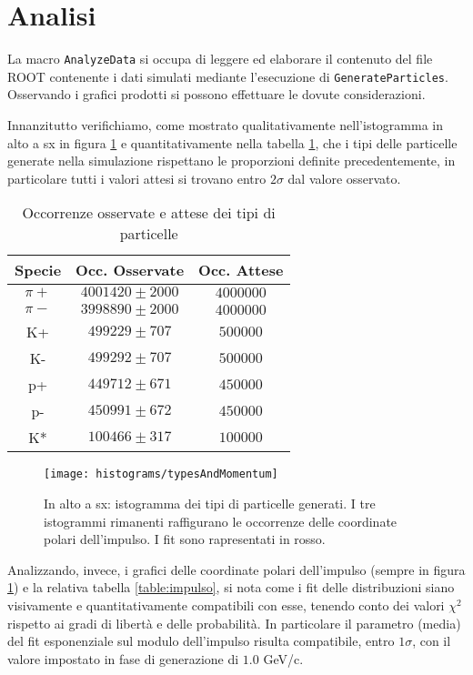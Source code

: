\documentclass{article}
\begin{document}
\section{Analisi}
La macro \texttt{AnalyzeData} si occupa di leggere ed elaborare il contenuto del file ROOT contenente i dati simulati mediante l'esecuzione di \texttt{GenerateParticles}. Osservando i grafici prodotti si possono effettuare le dovute considerazioni.

Innanzitutto verifichiamo, come mostrato qualitativamente nell'istogramma in alto a sx in figura \ref{fig:tipi} e quantitativamente nella tabella \ref{table:tipi}, che i tipi delle particelle generate nella simulazione rispettano le proporzioni definite precedentemente, in particolare tutti i valori attesi si trovano entro $2\sigma$ dal valore osservato.

\begin{table}[h]
    \centering
    \begin{tabular}{||c|c|c||}
        \hline
            Specie & Occ. Osservate & Occ. Attese \\
        \hline \hline
            $\pi+$ & $4001420 \pm 2000$ & $4000000$ \\
        \hline
            $\pi-$ & $3998890 \pm 2000$ & $4000000$ \\
        \hline
            K+ & $499229 \pm 707$ & $500000$ \\
        \hline
            K- & $499292 \pm 707$ & $500000$ \\
        \hline
            p+ & $449712 \pm 671$ & $450000$ \\
        \hline
            p- & $450991 \pm 672$ & $450000$ \\
        \hline
            K* & $100466 \pm 317$ & $100000$ \\
        \hline
    \end{tabular}
    \caption{Occorrenze osservate e attese dei tipi di particelle}
    \label{table:tipi}
\end{table}

\begin{figure}[hb!]
    \centering
    \texttt{[image: histograms/typesAndMomentum]}
    \caption{In alto a sx: istogramma dei tipi di particelle generati. I tre istogrammi rimanenti raffigurano le occorrenze delle coordinate polari dell'impulso. I fit sono rapresentati in rosso.}
    \label{fig:tipi}
\end{figure}

Analizzando, invece, i grafici delle coordinate polari dell'impulso (sempre in figura \ref{fig:tipi}) e la relativa tabella \ref{table:impulso}, si nota come i fit delle distribuzioni siano visivamente e quantitativamente compatibili con esse, tenendo conto dei valori $\chi^2$ rispetto ai gradi di libertà e delle probabilità. In particolare il parametro (media) del fit esponenziale sul modulo dell'impulso risulta compatibile, entro $1\sigma$, con il valore impostato in fase di generazione di $1.0$ GeV/c.
\end{document}
